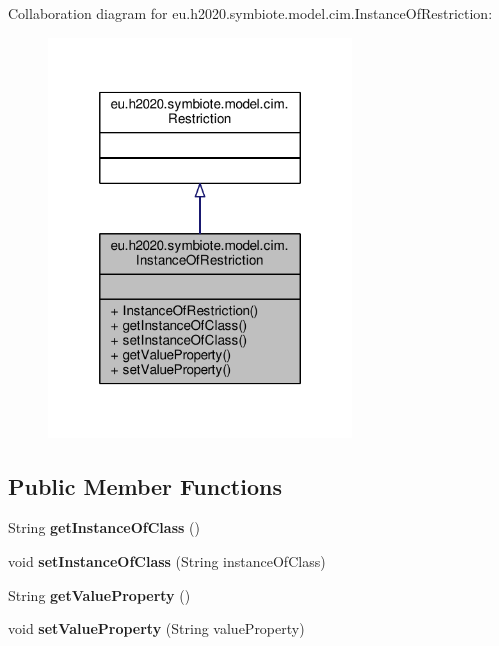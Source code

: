 Collaboration diagram for eu.\+h2020.\+symbiote.\+model.\+cim.\+Instance\+Of\+Restriction\+:\nopagebreak
\begin{figure}[H]
\begin{center}
\leavevmode
\includegraphics[width=228pt]{classeu_1_1h2020_1_1symbiote_1_1model_1_1cim_1_1InstanceOfRestriction__coll__graph}
\end{center}
\end{figure}
\subsection*{Public Member Functions}
\begin{DoxyCompactItemize}
\item 
\mbox{\label{classeu_1_1h2020_1_1symbiote_1_1model_1_1cim_1_1InstanceOfRestriction_a173517c4d7ad307a595f47e4e8820e51}} 
String {\bfseries get\+Instance\+Of\+Class} ()
\item 
\mbox{\label{classeu_1_1h2020_1_1symbiote_1_1model_1_1cim_1_1InstanceOfRestriction_a7d165c9b5acba06bbd3439977ccd4e90}} 
void {\bfseries set\+Instance\+Of\+Class} (String instance\+Of\+Class)
\item 
\mbox{\label{classeu_1_1h2020_1_1symbiote_1_1model_1_1cim_1_1InstanceOfRestriction_a9bc86ccf13b1a8097fb3f8c0a0867e18}} 
String {\bfseries get\+Value\+Property} ()
\item 
\mbox{\label{classeu_1_1h2020_1_1symbiote_1_1model_1_1cim_1_1InstanceOfRestriction_a2226c87377d30a10b77335f96d45cd0d}} 
void {\bfseries set\+Value\+Property} (String value\+Property)
\end{DoxyCompactItemize}


